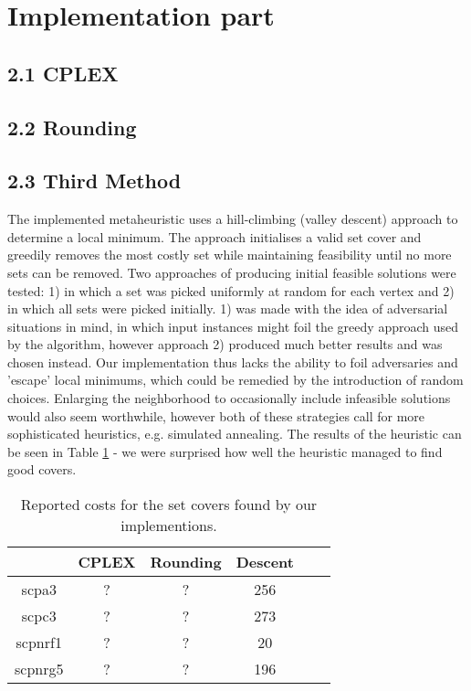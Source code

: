 \documentclass[12pt]{article}
\begin{document}
\pagebreak
\section*{Implementation part}
\subsection*{2.1 CPLEX}

\subsection*{2.2 Rounding}

\subsection*{2.3 Third Method}
The implemented metaheuristic uses a hill-climbing (valley descent) approach to determine a local minimum. The approach initialises a valid set cover and greedily removes the most costly set while maintaining feasibility until no more sets can be removed. Two approaches of producing initial feasible solutions were tested: 1) in which a set was picked uniformly at random for each vertex and 2) in which all sets were picked initially. 1) was made with the idea of adversarial situations in mind, in which input instances might foil the greedy approach used by the algorithm, however approach 2) produced much better results and was chosen instead. Our implementation thus lacks the ability to foil adversaries and 'escape' local minimums, which could be remedied by the introduction of random choices. Enlarging the neighborhood to occasionally include infeasible solutions would also seem worthwhile, however both of these strategies call for more sophisticated heuristics, e.g. simulated annealing. The results of the heuristic can be seen in Table \ref{times} - we were surprised how well the heuristic managed to find good covers.

\begin{table}[!hbt]
\center
\begin{tabular}{|c | c | c | c | c | c |}
\hline
& \multicolumn{1}{|c|}{CPLEX} & \multicolumn{1}{|c|}{Rounding} & \multicolumn{1}{|c|}{Descent} \\
\hline
scpa3 & ? & ? & 256 \\
\hline
scpc3 & ? & ? & 273 \\
\hline
scpnrf1 & ? & ? & 20 \\
\hline
scpnrg5 & ? & ? & 196 \\
\hline 
\end{tabular}
\caption{Reported costs for the set covers found by our implementions.
\label{times}}
\end{table}
\end{document}
